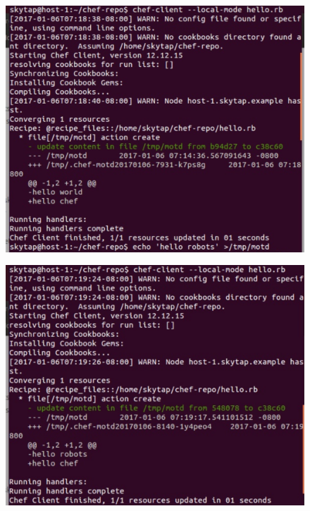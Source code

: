 \documentclass[12pt,letterpaper,boxed]{hmcpset}
\begin{document}
\begin{figure}[H]
  \centering
  \includegraphics[width = 1.0\textwidth]{8.png}
\end{figure}
\begin{figure}[H]
  \centering
  \includegraphics[width = 1.0\textwidth]{9.png}
\end{figure}
\end{document}
